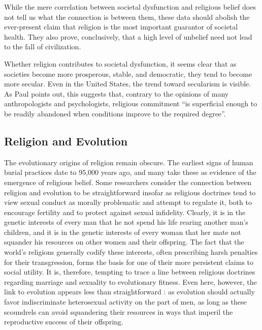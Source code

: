 \documentclass[a4paper,14pt]{extarticle}
\begin{document}
While the mere correlation between societal dysfunction and religious belief does not tell us what the connection is between them, these data should abolish the ever-present claim that religion is the most important guarantor of societal health.
They also prove, conclusively, that a high level of unbelief need not lead to the fall of civilization.

Whether religion contributes to societal dysfunction, it seems clear that as societies become more prosperous, stable, and democratic, they tend to become more secular.
Even in the United States, the trend toward secularism is visible.
As Paul points out, this suggests that, contrary to the opinions of many anthropologists and psychologists, religious commitment ``is superficial enough to be readily abandoned when conditions improve to the required degree''.

\subsection{Religion and Evolution}

The evolutionary origins of religion remain obscure.
The earliest signs of human burial practices date to 95,000 years ago, and many take these as evidence of the emergence of religious belief.
Some researchers consider the connection between religion and evolution to be straightforward insofar as religious doctrines tend to view sexual conduct as morally problematic and attempt to regulate it, both to encourage fertility and to protect against sexual infidelity.
Clearly, it is in the genetic interests of every man that he not spend his life rearing another man’s children, and it is in the genetic interests of every woman that her mate not squander his resources on other women and their offspring.
The fact that the world’s religions generally codify these interests, often prescribing harsh penalties for their transgression, forms the basis for one of their more persistent claims to social utility.
It is, therefore, tempting to trace a line between religious doctrines regarding marriage and sexuality to evolutionary fitness.
Even here, however, the link to evolution appears less than straightforward :
as evolution should actually favor indiscriminate heterosexual activity on the part of men, as long as these scoundrels can avoid squandering their resources in ways that imperil the reproductive success of their offspring.
\end{document}
